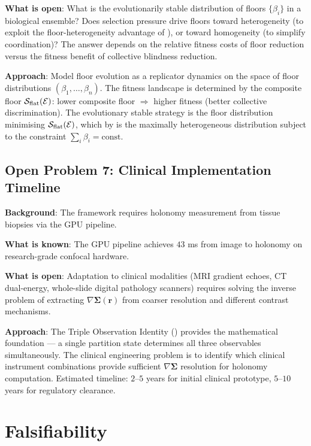 \textbf{What is open}: What is the evolutionarily stable distribution of
floors $\{\beta_i\}$ in a biological ensemble?  Does selection pressure drive
floors toward heterogeneity (to exploit the floor-heterogeneity advantage of
), or toward homogeneity (to simplify
coordination)?  The answer depends on the relative fitness costs of floor
reduction versus the fitness benefit of collective blindness reduction.

\textbf{Approach}: Model floor evolution as a replicator dynamics on the
space of floor distributions $(\beta_1, \ldots, \beta_n)$.  The fitness
landscape is determined by the composite floor $\mathcal{S}_{\mathrm{flat}}(\mathcal{E})$:
lower composite floor $\Rightarrow$ higher fitness (better collective discrimination).
The evolutionary stable strategy is the floor distribution minimising
$\mathcal{S}_{\mathrm{flat}}(\mathcal{E})$, which by  is the
maximally heterogeneous distribution subject to the constraint $\sum_i \beta_i = \text{const}$.

\subsection{Open Problem 7: Clinical Implementation Timeline}

\textbf{Background}: The framework requires holonomy measurement from tissue
biopsies via the GPU pipeline.

\textbf{What is known}: The GPU pipeline achieves $43$ ms from image to
holonomy on research-grade confocal hardware.

\textbf{What is open}: Adaptation to clinical modalities (MRI gradient echoes,
CT dual-energy, whole-slide digital pathology scanners) requires solving the
inverse problem of extracting $\nabla\boldsymbol{\Sigma}(\mathbf{r})$ from
coarser resolution and different contrast mechanisms.

\textbf{Approach}: The Triple Observation Identity ()
provides the mathematical foundation — a single partition state determines
all three observables simultaneously.  The clinical engineering problem is
to identify which clinical instrument combinations provide sufficient
$\nabla\boldsymbol{\Sigma}$ resolution for holonomy computation.  Estimated
timeline: $2$--$5$ years for initial clinical prototype, $5$--$10$ years for
regulatory clearance.

\section{Falsifiability}
\label{sec:falsifiability}

